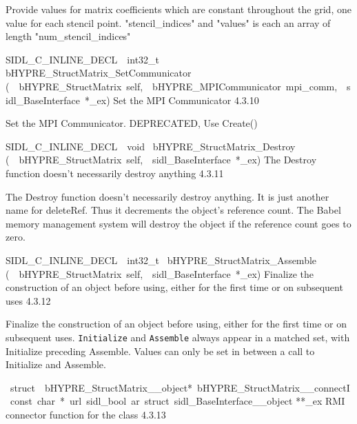 \documentclass{article}
\begin{document}
\begin{cxxentry}
\begin{cxxentry}
\begin{cxxfunction}
\begin{cxxdoc}
Provide values for matrix coefficients which are constant throughout
the grid, one value for each stencil point.
"stencil\_indices" and "values" is each an array of length
"num\_stencil\_indices" 
\end{cxxdoc}
\end{cxxfunction}
\begin{cxxfunction}
{SIDL\_C\_INLINE\_DECL\ \ int32\_t\ }
        {bHYPRE\_StructMatrix\_SetCommunicator}
        {(\ \ bHYPRE\_StructMatrix\ self,\ \ bHYPRE\_MPICommunicator\ mpi\_comm,\ \ sidl\_BaseInterface\ *\_ex)}
        {
Set the MPI Communicator}
        {4.3.10}
\begin{cxxdoc}

Set the MPI Communicator.  DEPRECATED, Use Create()
\end{cxxdoc}
\end{cxxfunction}
\begin{cxxfunction}
{SIDL\_C\_INLINE\_DECL\ \ void\ }
        {bHYPRE\_StructMatrix\_Destroy}
        {(\ \ bHYPRE\_StructMatrix\ self,\ \ sidl\_BaseInterface\ *\_ex)}
        {
The Destroy function doesn't necessarily destroy anything}
        {4.3.11}
\begin{cxxdoc}

The Destroy function doesn't necessarily destroy anything.
It is just another name for deleteRef.  Thus it decrements the
object's reference count.  The Babel memory management system will
destroy the object if the reference count goes to zero.
\end{cxxdoc}
\end{cxxfunction}
\begin{cxxfunction}
{SIDL\_C\_INLINE\_DECL\ \ int32\_t\ }
        {bHYPRE\_StructMatrix\_Assemble}
        {(\ \ bHYPRE\_StructMatrix\ self,\ \ sidl\_BaseInterface\ *\_ex)}
        {
Finalize the construction of an object before using, either
for the first time or on subsequent uses}
        {4.3.12}
\begin{cxxdoc}

Finalize the construction of an object before using, either
for the first time or on subsequent uses. {\tt Initialize}
and {\tt Assemble} always appear in a matched set, with
Initialize preceding Assemble. Values can only be set in
between a call to Initialize and Assemble.
\end{cxxdoc}
\end{cxxfunction}
\begin{cxxvariable}
{\ struct\ \ bHYPRE\_StructMatrix\_\_object*\ bHYPRE\_StructMatrix\_\_connectI\ const\ char\ *\ url\ sidl\_bool\ ar\ struct\ sidl\_BaseInterface\_\_object}
        {**\_ex}
        {}
        {
RMI connector function for the class}
        {4.3.13}
\begin{cxxdoc}


\end{cxxdoc}
\end{cxxvariable}
\end{cxxentry}
\end{cxxentry}
\end{document}
